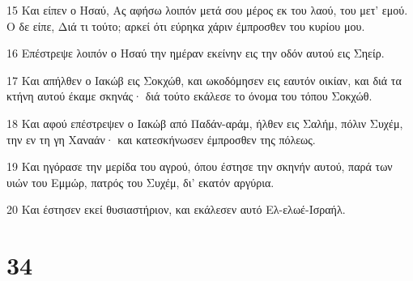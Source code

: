 \par 15 Και είπεν ο Ησαύ, Ας αφήσω λοιπόν μετά σου μέρος εκ του λαού, του μετ' εμού. Ο δε είπε, Διά τι τούτο; αρκεί ότι εύρηκα χάριν έμπροσθεν του κυρίου μου.
\par 16 Επέστρεψε λοιπόν ο Ησαύ την ημέραν εκείνην εις την οδόν αυτού εις Σηείρ.
\par 17 Και απήλθεν ο Ιακώβ εις Σοκχώθ, και ωκοδόμησεν εις εαυτόν οικίαν, και διά τα κτήνη αυτού έκαμε σκηνάς· διά τούτο εκάλεσε το όνομα του τόπου Σοκχώθ.
\par 18 Και αφού επέστρεψεν ο Ιακώβ από Παδάν-αράμ, ήλθεν εις Σαλήμ, πόλιν Συχέμ, την εν τη γη Χαναάν· και κατεσκήνωσεν έμπροσθεν της πόλεως.
\par 19 Και ηγόρασε την μερίδα του αγρού, όπου έστησε την σκηνήν αυτού, παρά των υιών του Εμμώρ, πατρός του Συχέμ, δι' εκατόν αργύρια.
\par 20 Και έστησεν εκεί θυσιαστήριον, και εκάλεσεν αυτό Ελ-ελωέ-Ισραήλ.

\chapter{34}

